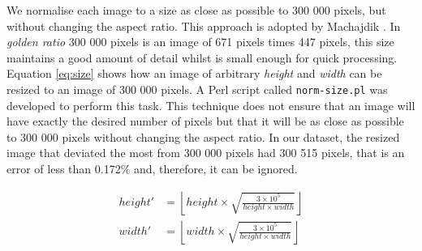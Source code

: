 \documentclass[11pt,a4paper,twoside,openright]{report}
\begin{document}
We normalise each image to a size as close as possible to 300 000 pixels, but
without changing the aspect ratio.  This approach is adopted by Machajdik
\cite{mach10clas}.  In \emph{golden ratio} 300 000 pixels is an image of 671
pixels times 447 pixels, this size maintains a good amount of detail whilst is
small enough for quick processing.  Equation \ref{eq:size} shows how an image
of arbitrary \emph{height} and \emph{width} can be resized to an image of 300
000 pixels.  A Perl script called \texttt{norm-size.pl} was developed to
perform this task.  This technique does not ensure that an image will have
exactly the desired number of pixels but that it will be as close as possible
to 300 000 pixels without changing the aspect ratio.  In our dataset, the
resized image that deviated the most from 300 000 pixels had 300 515 pixels,
that is an error of less than 0.172\% and, therefore, it can be ignored.

%
%

\begin{equation}
\begin{aligned}
height'  &= \left\lfloor
            height \times \sqrt{ \frac{3 \times 10^5}
                                      {height \times width} } \right\rfloor \\
width'   &= \left\lfloor
            width  \times \sqrt{ \frac{3 \times 10^5}
                                      {height \times width} } \right\rfloor \\
\label{eq:size}
\end{aligned}
\end{equation}
\end{document}
